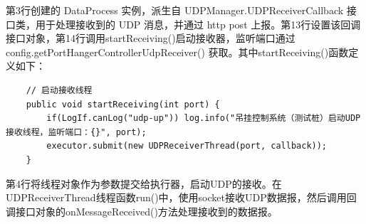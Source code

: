 第3行创建的 DataProcess 实例，派生自 UDPManager.UDPReceiverCallback 接口类，用于处理接收到的 UDP 消息，并通过 http post 上报。第13行设置该回调接口对象，第14行调用startReceiving()启动接收器，监听端口通过 config.getPortHangerControllerUdpReceiver() 获取。其中startReceiving()函数定义如下：
\begin{lstlisting}
    // 启动接收线程
    public void startReceiving(int port) {
        if(LogIf.canLog("udp-up")) log.info("吊挂控制系统（测试桩）启动UDP接收线程，监听端口：{}", port);
        executor.submit(new UDPReceiverThread(port, callback));
    }
\end{lstlisting}\vspace{-30pt}
第4行将线程对象作为参数提交给执行器，启动UDP的接收。在UDPReceiverThread线程函数run()中，使用socket接收UDP数据报，然后调用回调接口对象的onMessageReceived()方法处理接收到的数据报。

